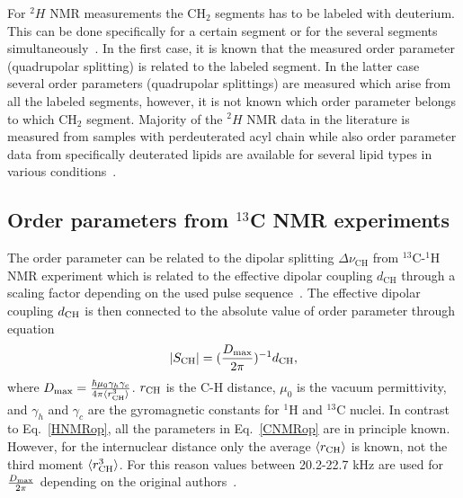 \documentclass[aps,prl,superscriptaddress,twocolumn]{revtex4}
\begin{document}
For $^2H$ NMR measurements the CH$_2$ segments has to be labeled with deuterium.
This can be done specifically for a certain segment or for the several segments
simultaneously~\cite{davis83,bloom91,leftin11}. In the first case, it is known that the measured
order parameter (quadrupolar splitting) is related to the labeled segment.
In the latter case several order parameters (quadrupolar splittings) are
measured which arise from all the labeled segments, however, it is not known 
which order parameter belongs to which CH$_2$ segment. Majority of the $^2H$ NMR data
in the literature is measured from samples with perdeuterated acyl chain \cite{leftin11,marsh13}
while also order parameter data from specifically deuterated lipids are available for 
several lipid types in various conditions~\cite{seelig74,seelig75,seelig77,seelig78,gally81,akutsu81,altenbach84,scherer89,kuchinka89,roux90,ulrich94,douliez95}.

\subsection{Order parameters from $^{13}$C NMR experiments}\label{CopSECTION}

The order parameter can be related to the dipolar splitting $\Delta \nu_\mathrm{CH}$ 
from $^{13}$C-$^1$H NMR experiment which is related to the effective dipolar 
coupling $d_\mathrm{CH}$ through a scaling factor depending on the used pulse 
sequence~\cite{hong95a,gross97,dvinskikh05a,ferreira13}. The effective dipolar 
coupling $d_{{\rm CH}}$ is then connected to the absolute value of order parameter through equation
\begin{equation}\label{CNMRop}
|S_{{\rm CH}}|=(\frac{D_{{\rm max}}}{2\pi})^{-1}d_\mathrm{CH},
\end{equation}
where $D_{{\rm max}} = \frac{\hbar \mu_0 \gamma_h \gamma_c}{4\pi\langle r_\mathrm{CH}^3 \rangle}$. 
$r_{{\rm CH}}$ is the C-H distance, $\mu_0$ is the vacuum permittivity, and $\gamma_h$ and $\gamma_c$ are 
the gyromagnetic constants for $^1$H and $^{13}$C nuclei. In contrast to Eq.~\ref{HNMRop}, all the parameters in 
Eq.~\ref{CNMRop} are in principle known. However, for the internuclear distance only the average $\langle r_{{\rm CH}} \rangle$ 
is known, not the third moment $\langle r^3_{{\rm CH}} \rangle$. For this reason values between 20.2-22.7 kHz are used for
$\frac{D_{{\rm max}}}{2\pi}$ depending on the original authors~\cite{hong95a,gross97,dvinskikh05a,becker05,ferreira13,ferreira15}.
\end{document}
